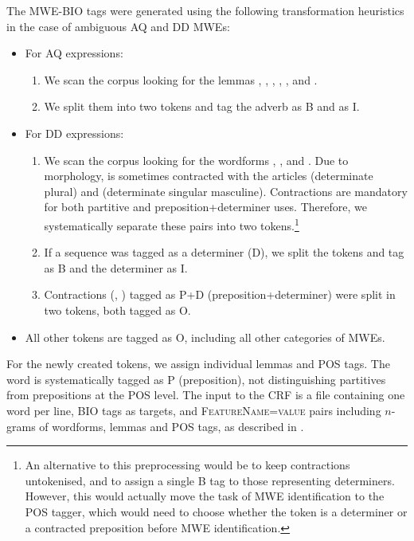 \documentclass[output=paper,
modfonts
]{langscibook}
\begin{document}
The MWE-BIO tags were generated using the following transformation heuristics in the case of ambiguous AQ and DD MWEs: 
\begin{itemize}
  \item For AQ expressions:
  \begin{enumerate}
  \item We scan the corpus looking for the lemmas , , , , ,  and .%
  \item We split them into two tokens and tag the adverb as {\textsc B} and  as {\textsc I}.
  \end{enumerate}
  \item For DD expressions:
  \begin{enumerate}
  \item We scan the corpus looking for the wordforms , ,  and . Due to  morphology,  is sometimes contracted with the articles  (determinate plural) and  (determinate singular masculine). Contractions are mandatory for both partitive and preposition+determiner uses. Therefore, we systematically separate these pairs into two tokens.\footnote{An alternative to this preprocessing would be to keep contractions untokenised, and to assign a single \textsc{B} tag to those representing determiners. However, this would actually move the task of MWE identification to the POS tagger, which would need to choose whether the token is a determiner or a contracted preposition before MWE identification.}
  \item If a sequence was tagged as a determiner ({\textsc D}), we split the tokens and tag  as {\textsc B} and the determiner as {\textsc I}. 
  \item Contractions (, ) tagged as {\textsc P+D} (preposition+determiner) were split in two tokens, both tagged as {\textsc O}.
  \end{enumerate}
  \item All other tokens are tagged as {\textsc O}, including all other categories of MWEs.
\end{itemize}

For the newly created tokens, we assign individual lemmas and POS tags. The word  is systematically tagged as \textsc{P} (preposition), not distinguishing partitives from prepositions at the POS level. The input to the CRF is a file containing one word per line, BIO tags as targets, and \textsc{FeatureName=value} pairs including $n$-grams of wordforms, lemmas and POS tags, as described in . %
\end{document}
